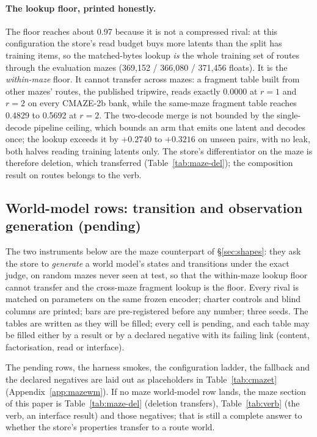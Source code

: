 \documentclass{article} %
\begin{document}
\paragraph{The lookup floor, printed honestly.} The floor reaches about 0.97 because it is not a
compressed rival: at this configuration the store's read budget buys more latents than the split
has training items, so the matched-bytes lookup \emph{is} the whole training set of routes
through the evaluation mazes (369,152 / 366,080 / 371,456 floats). %
It is the \emph{within-maze} floor. It cannot transfer across mazes: a fragment table built from
other mazes' routes, the published tripwire, reads exactly 0.0000 at $r=1$ and $r=2$ on every
CMAZE-2b bank, while the same-maze fragment table reaches 0.4829 to 0.5692 at $r=2$.
The two-decode merge is not bounded by the single-decode pipeline ceiling, which bounds an arm
that emits one latent and decodes once; the lookup exceeds it by $+0.2740$ to $+0.3216$ on
unseen pairs, with no leak, both halves reading training latents only.
The store's differentiator on the maze is therefore deletion, which transferred
(Table~\ref{tab:maze-del}); the composition result on routes belongs to the verb.

\subsection{World-model rows: transition and observation generation (pending)}
\label{sec:maze-wm}

The two instruments below are the maze counterpart of \S\ref{sec:shapes}: they ask the store to
\emph{generate} a world model's states and transitions under the exact judge, on random mazes
never seen at test, so that the within-maze lookup floor cannot transfer and the cross-maze
fragment lookup is the floor. Every rival is matched on parameters on the same frozen encoder;
charter controls and blind columns are printed; bars are pre-registered before any number;
three seeds. The tables are written as they will be filled; every cell is pending, and each
table may be filled either by a result or by a declared negative with its failing link
(content, factorisation, read or interface).

The pending rows, the harness smokes, the configuration ladder, the fallback and the declared
negatives are laid out as placeholders in Table~\ref{tab:cmazet} (Appendix~\ref{app:mazewm}).
If no maze world-model row lands, the maze section of this paper is Table~\ref{tab:maze-del}
(deletion transfers), Table~\ref{tab:verb} (the verb, an interface result) and those negatives;
that is still a complete answer to whether the store's properties transfer to a route world.
\end{document}
